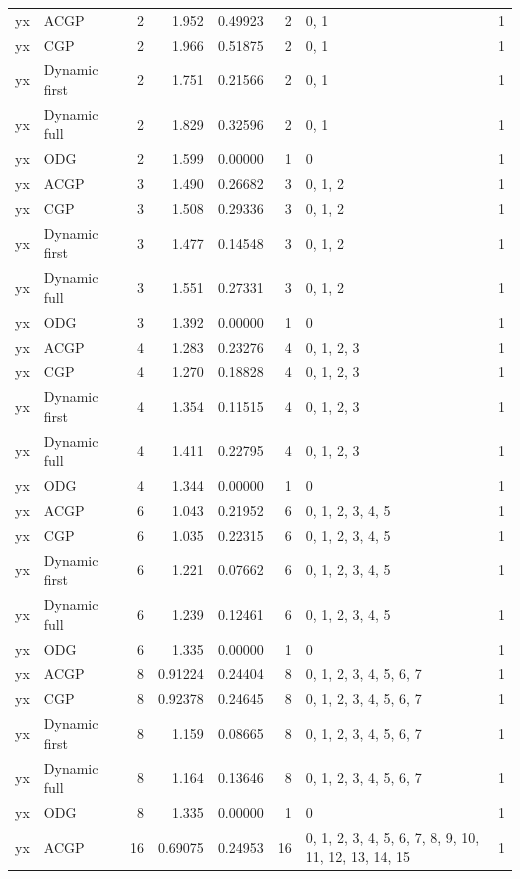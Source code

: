 \documentclass[10pt,a4paper]{article}
\begin{document}
\begin{longtable}{@{}p{23mm}p{29mm}rrrrp{36mm}r@{}}
yx & ACGP & 2 & 1.952 & 0.49923 & 2 & 0, 1 & 1 \\
yx & CGP & 2 & 1.966 & 0.51875 & 2 & 0, 1 & 1 \\
yx & Dynamic first & 2 & 1.751 & 0.21566 & 2 & 0, 1 & 1 \\
yx & Dynamic full & 2 & 1.829 & 0.32596 & 2 & 0, 1 & 1 \\
yx & ODG & 2 & 1.599 & 0.00000 & 1 & 0 & 1 \\
yx & ACGP & 3 & 1.490 & 0.26682 & 3 & 0, 1, 2 & 1 \\
yx & CGP & 3 & 1.508 & 0.29336 & 3 & 0, 1, 2 & 1 \\
yx & Dynamic first & 3 & 1.477 & 0.14548 & 3 & 0, 1, 2 & 1 \\
yx & Dynamic full & 3 & 1.551 & 0.27331 & 3 & 0, 1, 2 & 1 \\
yx & ODG & 3 & 1.392 & 0.00000 & 1 & 0 & 1 \\
yx & ACGP & 4 & 1.283 & 0.23276 & 4 & 0, 1, 2, 3 & 1 \\
yx & CGP & 4 & 1.270 & 0.18828 & 4 & 0, 1, 2, 3 & 1 \\
yx & Dynamic first & 4 & 1.354 & 0.11515 & 4 & 0, 1, 2, 3 & 1 \\
yx & Dynamic full & 4 & 1.411 & 0.22795 & 4 & 0, 1, 2, 3 & 1 \\
yx & ODG & 4 & 1.344 & 0.00000 & 1 & 0 & 1 \\
yx & ACGP & 6 & 1.043 & 0.21952 & 6 & 0, 1, 2, 3, 4, 5 & 1 \\
yx & CGP & 6 & 1.035 & 0.22315 & 6 & 0, 1, 2, 3, 4, 5 & 1 \\
yx & Dynamic first & 6 & 1.221 & 0.07662 & 6 & 0, 1, 2, 3, 4, 5 & 1 \\
yx & Dynamic full & 6 & 1.239 & 0.12461 & 6 & 0, 1, 2, 3, 4, 5 & 1 \\
yx & ODG & 6 & 1.335 & 0.00000 & 1 & 0 & 1 \\
yx & ACGP & 8 & 0.91224 & 0.24404 & 8 & 0, 1, 2, 3, 4, 5, 6, 7 & 1 \\
yx & CGP & 8 & 0.92378 & 0.24645 & 8 & 0, 1, 2, 3, 4, 5, 6, 7 & 1 \\
yx & Dynamic first & 8 & 1.159 & 0.08665 & 8 & 0, 1, 2, 3, 4, 5, 6, 7 & 1 \\
yx & Dynamic full & 8 & 1.164 & 0.13646 & 8 & 0, 1, 2, 3, 4, 5, 6, 7 & 1 \\
yx & ODG & 8 & 1.335 & 0.00000 & 1 & 0 & 1 \\
yx & ACGP & 16 & 0.69075 & 0.24953 & 16 & 0, 1, 2, 3, 4, 5, 6, 7, 8, 9, 10, 11, 12, 13, 14, 15 & 1 \\

\end{longtable}
\end{document}
